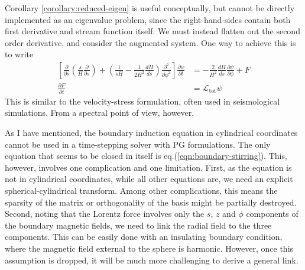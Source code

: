 Corollary \ref{corollary:reduced-eigen} is useful conceptually, but cannot be directly implemented as an eigenvalue problem, since the right-hand-sides contain both first derivative and stream function itself. We must instead flatten out the second order derivative, and consider the augmented system. One way to achieve this is to write
\[\begin{aligned}
    \left[\frac{\partial}{\partial s}\left(\frac{s}{H}\frac{\partial}{\partial s}\right) + \left(\frac{1}{sH} - \frac{1}{2H^2} \frac{dH}{ds}\right)\frac{\partial^2}{\partial \phi^2}\right] \frac{\partial \psi}{\partial t} &= - \frac{2}{H^2}\frac{dH}{ds} \frac{\partial \psi}{\partial \phi} + F \\ 
    \frac{\partial F}{\partial t} &= \mathcal{L}_\mathrm{tot} \psi
\end{aligned}\]
This is similar to the velocity-stress formulation, often used in seismological simulations. From a spectral point of view, however, 

As I have mentioned, the boundary induction equation in cylindrical coordinates cannot be used in a time-stepping solver with PG formulations. The only equation that seems to be closed in itself is eq.(\ref{eqn:boundary-stirring}). This, however, involves one complication and one limitation. First, as the equation is not in cylindrical coordinates, while all other equations are, we need an explicit spherical-cylindrical transform. Among other complications, this means the sparsity of the matrix or orthogonality of the basis might be partially destroyed. Second, noting that the Lorentz force involves only the $s$, $z$ and $\phi$ components of the boundary magnetic fields, we need to link the radial field to the three components. This can be easily done with an insulating boundary condition, where the magnetic field external to the sphere is harmonic. However, once this assumption is dropped, it will be much more challenging to derive a general link.
